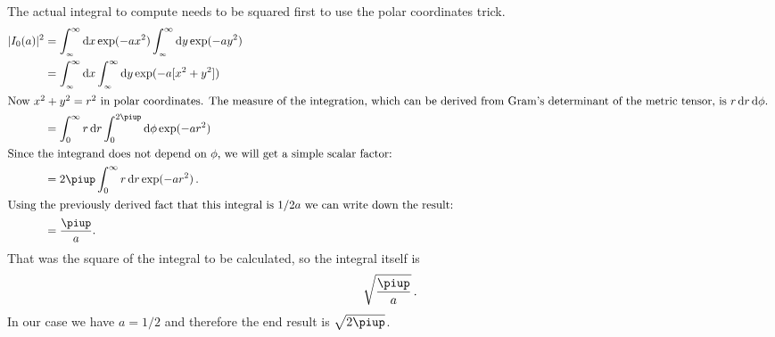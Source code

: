 \documentclass[11pt, english, fleqn, DIV=15, headinclude]{scrartcl}
\begin{document}
The actual integral to compute needs to be squared first to use the polar
coordinates trick.
\begin{align*}
    |I_0(a)|^2
    &=
    \int_{_\infty}^\infty \dif x \exp(-ax^2)
    \int_{_\infty}^\infty \dif y \exp(-ay^2) \\
    &=
    \int_{_\infty}^\infty \dif x \int_{_\infty}^\infty \dif y \exp(-a[x^2+y^2]) \\
    \intertext{%
        Now $x^2 + y^2 = r^2$ in polar coordinates. The measure of the
        integration, which can be derived from Gram's determinant of the
        metric tensor, is $r \dif r \dif \phi$.
    }
    &= \int_0^\infty r \dif r \int_0^{2\piup} \dif \phi \exp(-ar^2) \\
    \intertext{%
        Since the integrand does not depend on $\phi$, we will get a simple
        scalar factor:
    }
    &= 2 \piup \int_0^\infty r \dif r \exp(-ar^2) \,. \\
    \intertext{%
        Using the previously derived fact that this integral is $1/2a$ we can
        write down the result:
    }
    &= \frac{\piup}a.
\end{align*}
That was the square of the integral to be calculated, so the integral itself is
\[
    \sqrt{\frac\piup a} \,.
\]
In our case we have $a = 1/2$ and therefore the end result is $\sqrt{2 \piup}$.
\end{document}
